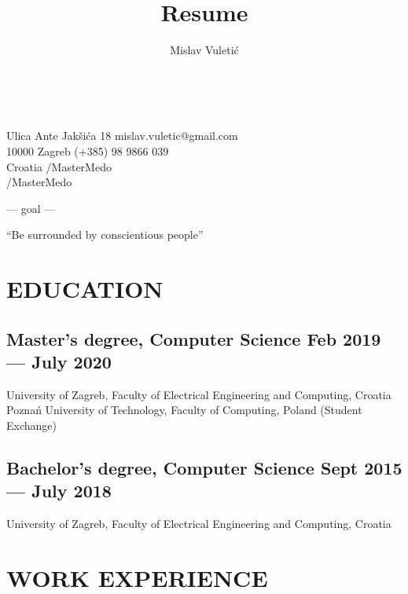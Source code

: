 \documentclass{article}
\newenvironment{goalfont}{\fontfamily{uncl}\selectfont}{\par}
\begin{document}
\title{Resume}
\author{Mislav Vuletić}

\Huge\bfseries\theauthor\

\mdseries\large

Ulica Ante Jakšića 18 \hfill mislav.vuletic@gmail.com\\
10000 Zagreb                    \hfill {} (+385) 98 9866 039\\
Croatia                         \hfill {}/MasterMedo\\
\-                              \hfill {}/MasterMedo

\normalsize

\begin{center}
        \begin{goalfont}
        --- goal ---
        \end{goalfont}
        ``Be surrounded by conscientious people''
\end{center}

\section{EDUCATION}
\subsection{Master's degree, Computer Science \hfill Feb 2019 --- July 2020}
University of Zagreb, Faculty of Electrical Engineering and Computing, Croatia\\
Poznań University of Technology, Faculty of Computing, Poland (Student Exchange)

\subsection{Bachelor's degree, Computer Science \hfill Sept 2015 --- July 2018}
University of Zagreb, Faculty of Electrical Engineering and Computing, Croatia


\section{WORK EXPERIENCE}
\end{document}
